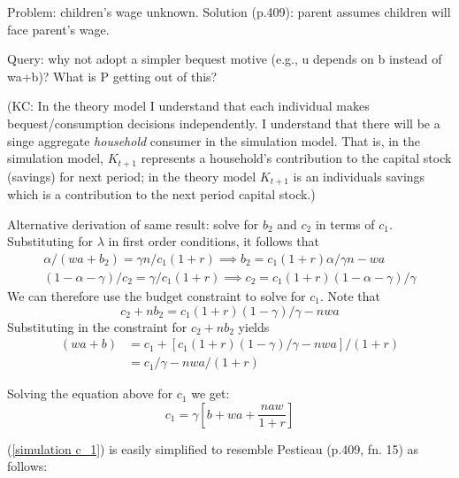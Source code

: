 \documentclass{article}
\begin{document}
Problem: children's wage unknown.
Solution (p.409): parent assumes children will face parent's wage.

Query:
why not adopt a simpler bequest motive (e.g., u depends on b instead of wa+b)?
What is P getting out of this?

(KC: In the theory model I understand that each individual makes bequest/consumption decisions independently.  I understand that there will be a singe aggregate \emph{household} consumer in the simulation model.  That is, in the simulation model, $K_{t+1}$ represents a household's contribution to the capital stock (savings) for next period; in the theory model $K_{t+1}$ is an individuals savings which is a contribution to the next period capital stock.)\newline



Alternative derivation of same result: solve for $b_{2}$ and $c_{2}$ in terms of $c_{1}$.\\
Substituting for $\lambda$ in first order conditions, it follows that
\begin{gather}
\alpha/(wa+b_{2}) = \gamma n/ c_{1} (1+r) \implies b_{2} = c_{1} (1+r) \alpha /\gamma n - wa
\\
(1-\alpha-\gamma)/ c_{2} = \gamma / c_{1} (1+r)  \implies  c_{2} = c_{1}(1+r) (1-\alpha-\gamma)/\gamma
\end{gather}
We can therefore use the budget constraint to solve for $c_{1}$.
Note that
\begin{equation}
c_{2} + n b_{2} = c_{1}(1+r)(1-\gamma)/\gamma - nwa
\end{equation}
Substituting in the constraint for $c_{2} + n b_{2}$ yields
\begin{equation}
\begin{split}
(w a + b)
&= c_{1} + [c_{1}(1+r)(1-\gamma)/\gamma - nwa]/(1+r)
\\
&= c_{1}/\gamma - nwa/(1+r)
\end{split}
\end{equation}

Solving the equation above for $c_{1}$ we get:
\begin{equation}\label{simulation c_1}
c_{1} = \gamma[b + wa + \frac{naw}{1+r}]
\end{equation}

(\ref{simulation c_1}) is easily simplified to resemble Pestieau (p.409, fn. 15) as follows:
\end{document}
